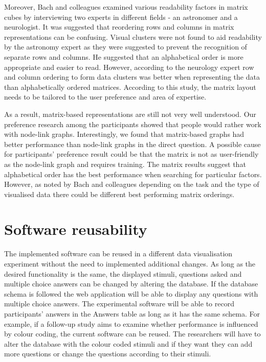 \documentclass{l4proj}
\begin{document}
Moreover, Bach and colleagues \cite{bach2014visualizing} examined various readability factors in matrix cubes by interviewing two experts in different fields - an astronomer and a neurologist. It was suggested that reordering rows and columns in matrix representations can be confusing. Visual clusters were not found to aid readability by the astronomy expert as they were suggested to prevent the recognition of separate rows and columns. He suggested that an alphabetical order is more appropriate and easier to read. However, according to the neurology expert row and column ordering to form data clusters was better when representing the data than alphabetically ordered matrices. According to this study, the matrix layout needs to be tailored to the user preference and area of expertise.

As a result, matrix-based representations are still not very well understood. Our preference research among the participants showed that people would rather work with node-link graphs. Interestingly, we found that matrix-based graphs had better performance than node-link graphs in the direct question. A possible cause for participants' preference result could be that the matrix is not as user-friendly as the node-link graph and requires training. The matrix results suggest that alphabetical order has the best performance when searching for particular factors. However, as noted by Bach and colleagues \cite{bach2014visualizing} depending on the task and the type of visualised data there could be different best performing matrix orderings. 

\section{Software reusability}

The implemented software can be reused in a different data visualisation experiment without the need to implemented additional changes. As long as the desired functionality is the same, the displayed stimuli, questions asked and multiple choice answers can be changed by altering the database. If the database schema is followed the web application will be able to display any questions with multiple choice answers. The experimental software will be able to record participants' answers in the Answers table as long as it has the same schema. For example, if a follow-up study aims to examine whether performance is influenced by colour coding, the current software can be reused. The researchers will have to alter the database with the colour coded stimuli and if they want they can add more questions or change the questions according to their stimuli. 
\end{document}
